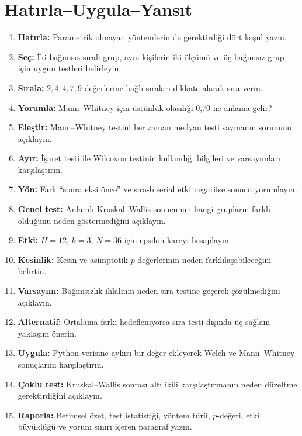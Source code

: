 


\section*{Hatırla--Uygula--Yansıt}

\begin{enumerate}
\renewcommand{\labelenumi}{\textbf{\Alph{enumi}.}}
  \item \textbf{Hatırla:} Parametrik olmayan yöntemlerin de gerektirdiği dört koşul yazın.
  \item \textbf{Seç:} İki bağımsız sıralı grup, aynı kişilerin iki ölçümü ve üç bağımsız grup için uygun testleri belirleyin.
  \item \textbf{Sırala:} $2,4,4,7,9$ değerlerine bağlı sıraları dikkate alarak sıra verin.
  \item \textbf{Yorumla:} Mann--Whitney için üstünlük olasılığı 0,70 ne anlama gelir?
  \item \textbf{Eleştir:} Mann--Whitney testini her zaman medyan testi saymanın sorununu açıklayın.
  \item \textbf{Ayır:} İşaret testi ile Wilcoxon testinin kullandığı bilgileri ve varsayımları karşılaştırın.
  \item \textbf{Yön:} Fark ``sonra eksi önce'' ve sıra-biserial etki negatifse sonucu yorumlayın.
  \item \textbf{Genel test:} Anlamlı Kruskal--Wallis sonucunun hangi grupların farklı olduğunu neden göstermediğini açıklayın.
  \item \textbf{Etki:} $H=12$, $k=3$, $N=36$ için epsilon-kareyi hesaplayın.
  \item \textbf{Kesinlik:} Kesin ve asimptotik $p$-değerlerinin neden farklılaşabileceğini belirtin.
  \item \textbf{Varsayım:} Bağımsızlık ihlalinin neden sıra testine geçerek çözülmediğini açıklayın.
  \item \textbf{Alternatif:} Ortalama farkı hedefleniyorsa sıra testi dışında üç sağlam yaklaşım önerin.
  \item \textbf{Uygula:} Python verisine aykırı bir değer ekleyerek Welch ve Mann--Whitney sonuçlarını karşılaştırın.
  \item \textbf{Çoklu test:} Kruskal--Wallis sonrası altı ikili karşılaştırmanın neden düzeltme gerektirdiğini açıklayın.
  \item \textbf{Raporla:} Betimsel özet, test istatistiği, yöntem türü, $p$-değeri, etki büyüklüğü ve yorum sınırı içeren paragraf yazın.
\end{enumerate}